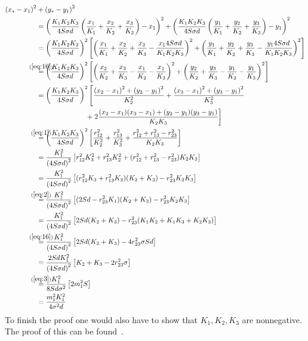\begin{align}
  {(x_\ast - x_1)}^2
  &+ {(y_\ast - y_1)}^2 \\
  &= {\left( \frac{K_1 K_2 K_3}{4 S \sigma d} \left( \frac{x_1}{K_1} +
    \frac{x_2}{K_2} + \frac{x_3}{K_3} \right) - x_1 \right)}^2 +
    {\left( \frac{K_1 K_2 K_3}{4 S \sigma d} \left( \frac{y_1}{K_1} +
    \frac{y_2}{K_2} + \frac{y_3}{K_3} \right) - y_1 \right)}^2 \\
  &= {\left( \frac{K_1 K_2 K_3}{4 S \sigma d} \right)}^2 \left[{\left(
    \frac{x_1}{K_1} + \frac{x_2}{K_2} + \frac{x_3}{K_3} -
    \frac{x_1 4 S \sigma d}{K_1 K_2 K_3} \right)}^2 + {\left(
    \frac{y_1}{K_1} + \frac{y_2}{K_2} + \frac{y_3}{K_3} -
    \frac{y_1 4 S \sigma d}{K_1 K_2 K_3} \right)}^2 \right] \\
  &\stackrel{\mathclap{(\ref{eq:16})}}{=}
    {\left( \frac{K_1 K_2 K_3}{4 S \sigma d} \right)}^2
    \left[ {\left( \frac{x_2}{K_2} + \frac{x_3}{K_3} - \frac{x_1}{K_2} -
    \frac{x_1}{K_3} \right)}^2 + {\left( \frac{y_2}{K_2} + \frac{y_3}{K_3} -
    \frac{y_1}{K_2} - \frac{y_1}{K_3} \right)}^2 \right] \\
  &= {\left( \frac{K_1 K_2 K_3}{4 S \sigma d} \right)}^2
    \left[ \frac{{(x_2 - x_1)}^2 + {(y_2 - y_1)}^2}{K_2^2} +
    \frac{{(x_3 - x_1)}^2 + {(y_3 - y_1)}^2}{K_3^2} \right. \\
  &\hspace{7em} \left. + \; 2 \frac{(x_2 - x_1)(x_3 - x_1) +
    (y_2 - y_1)(y_3 - y_1)}{K_2 K_3} \right] \\
  &\stackrel{\mathclap{(\ref{eq:1})}}{=}
    {\left( \frac{K_1 K_2 K_3}{4 S \sigma d} \right)}^2
    \left[ \frac{r_{12}^2}{K_2^2} + \frac{r_{13}^2}{K_3^2} +
    \frac{r_{12}^2 + r_{13}^2 - r_{23}^2}{K_2 K_3} \right] \\
  &= \frac{K_1^2}{{(4 S \sigma d)}^2}
    \left[ r_{12}^2 K_3^2 + r_{13}^2 K_2^2 +
    (r_{12}^2 + r_{13}^2 - r_{23}^2) K_2 K_3 \right] \\
  &= \frac{K_1^2}{{(4 S \sigma d)}^2}
    \left[ (r_{12}^2 K_3 + r_{13}^2 K_2) (K_2 + K_3) -
    r_{23}^2 K_2 K_3 \right] \\
  &\stackrel{\mathclap{(\ref{eq:2})}}{=}
    \frac{K_1^2}{{(4 S \sigma d)}^2}
    \left[ (2 S d - r_{23}^2 K_1) (K_2 + K_3) - r_{23}^2 K_2 K_3 \right] \\
  &= \frac{K_1^2}{{(4 S \sigma d)}^2}
    \left[ 2 S d (K_2 + K_3) - r_{23}^2 (K_1 K_2 + K_1 K_3 + K_2 K_3) \right] \\
  &\stackrel{\mathclap{(\ref{eq:16})}}{=}
    \frac{K_1^2}{{(4 S \sigma d)}^2}
    \left[ 2 S d (K_2 + K_3) - 4 r_{23}^2 \sigma S d \right] \\
  &= \frac{2 S d K_1^2}{{(4 S \sigma d)}^2}
    \left[ K_2 + K_3 - 2 r_{23}^2 \sigma \right] \\
  &\stackrel{\mathclap{(\ref{eq:3})}}{=}
    \frac{K_1^2}{8 S d \sigma^2}
    \left[ 2 m_1^2 S \right] \\
  &= \frac{m_1^2 K_1^2}{4 \sigma^2 d}
\end{align}
%
To finish the proof one would also have to show that $K_1, K_2, K_3$ are
nonnegative.  The proof of this can be found~\cite[p.~5-6]{Uteshev2012}.

